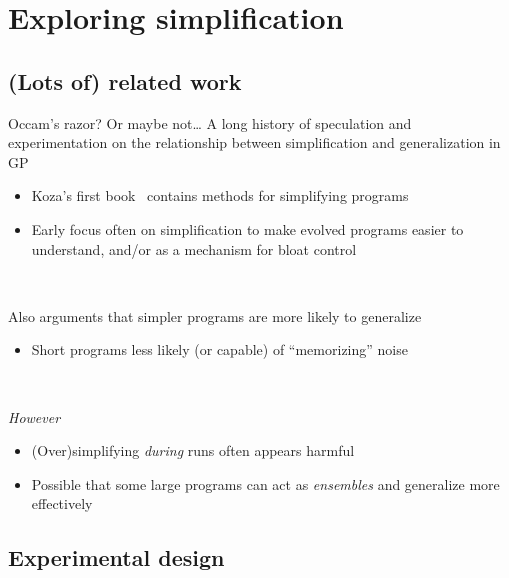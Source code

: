 \documentclass{beamer}
\begin{document}
\section{Exploring simplification}

\subsection{(Lots of) related work}

\begin{frame}{Occam's razor? Or maybe not\ldots}
A long history of speculation and experimentation on the relationship between simplification and generalization in GP
\begin{itemize}
	\item Koza's first book~\cite{koza1992genetic} contains methods for simplifying programs
	\item Early focus often on simplification to make evolved programs easier to understand, and/or as a mechanism for bloat control
\end{itemize}

~

Also arguments that simpler programs are more likely to generalize~\cite{hooper:1996:iarGPes}
\begin{itemize}
	\item Short programs less likely (or capable) of ``memorizing'' noise
\end{itemize}

~

\emph{However}
\begin{itemize}
	\item (Over)simplifying \emph{during} runs often appears harmful
	\item Possible that some large programs can act as \emph{ensembles} and generalize more effectively~\cite{gonccalves2015generalization}
\end{itemize}


\end{frame}

\subsection{Experimental design}
\end{document}
